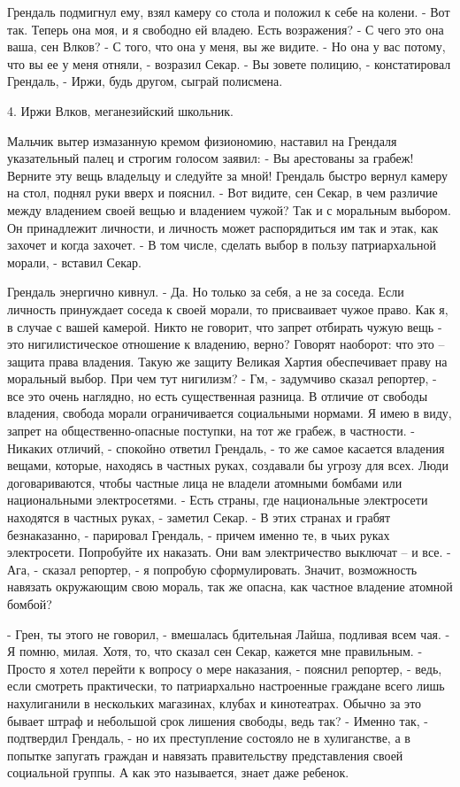 \documentclass{book}
\begin{document}
Грендаль подмигнул ему, взял камеру со стола и положил к себе на колени.
- Вот так. Теперь она моя, и я свободно ей владею. Есть возражения?
- С чего это она ваша, сен Влков?
- С того, что она у меня, вы же видите.
- Но она у вас потому, что вы ее у меня отняли, - возразил Секар.
- Вы зовете полицию, - констатировал Грендаль, - Иржи, будь другом, сыграй полисмена.


4. Иржи Влков, меганезийский школьник.


Мальчик вытер измазанную кремом физиономию, наставил на Грендаля указательный палец и строгим голосом заявил:
- Вы арестованы за грабеж! Верните эту вещь владельцу и следуйте за мной!
Грендаль быстро вернул камеру на стол, поднял руки вверх и пояснил.
- Вот видите, сен Секар, в чем различие между владением своей вещью и владением чужой? Так и с моральным выбором. Он принадлежит личности, и личность может распорядиться им так и этак, как захочет и когда захочет.
- В том числе, сделать выбор в пользу патриархальной морали, - вставил Секар.

Грендаль энергично кивнул.
- Да. Но только за себя, а не за соседа. Если личность принуждает соседа к своей морали, то присваивает чужое право. Как я, в случае с вашей камерой. Никто не говорит, что запрет отбирать чужую вещь - это нигилистическое отношение к владению, верно? Говорят наоборот: что это – защита права владения. Такую же защиту Великая Хартия обеспечивает праву на моральный выбор. При чем тут нигилизм?
- Гм, - задумчиво сказал репортер, - все это очень наглядно, но есть существенная разница. В отличие от свободы владения, свобода морали ограничивается социальными нормами. Я имею в виду, запрет на общественно-опасные поступки, на тот же грабеж, в частности.
- Никаких отличий, - спокойно ответил Грендаль, - то же самое касается владения вещами, которые, находясь в частных руках, создавали бы угрозу для всех. Люди договариваются, чтобы частные лица не владели атомными бомбами или национальными электросетями.
- Есть страны, где национальные электросети находятся в частных руках, - заметил Секар.
- В этих странах и грабят безнаказанно, - парировал Грендаль, - причем именно те, в чьих руках электросети. Попробуйте их наказать. Они вам электричество выключат – и все.
- Ага, - сказал репортер, - я попробую сформулировать. Значит, возможность навязать окружающим свою мораль, так же опасна, как частное владение атомной бомбой?

- Грен, ты этого не говорил, - вмешалась бдительная Лайша, подливая всем чая.
- Я помню, милая. Хотя, то, что сказал сен Секар, кажется мне правильным.
- Просто я хотел перейти к вопросу о мере наказания, - пояснил репортер, - ведь, если смотреть практически, то патриархально настроенные граждане всего лишь нахулиганили в нескольких магазинах, клубах и кинотеатрах. Обычно за это бывает штраф и небольшой срок лишения свободы, ведь так?
- Именно так, - подтвердил Грендаль, - но их преступление состояло не в хулиганстве, а в попытке запугать граждан и навязать правительству представления своей социальной группы. А как это называется, знает даже ребенок.
\end{document}
